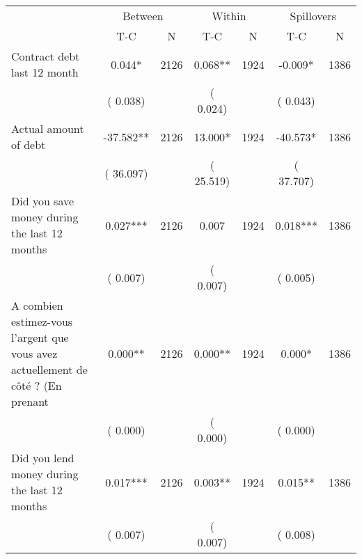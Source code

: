 
\begin{tabular}{l*{6}{c}}\hline&\multicolumn{2}{c}{Between}&\multicolumn{2}{c}{Within}&\multicolumn{2}{c}{Spillovers} \\ \cmidrule(r){2-3}\cmidrule(l){4-5}\cmidrule(l){6-7} & {T-C} & {N} & {T-C} & {N}  & {T-C}  & {N}  \\ \midrule
Contract debt last 12 month        &              0.044*      &       2126       &              0.068**      &       1924       &             -0.009*      &       1386       \\
                       &       (       0.038)            &                               &       (       0.024)            &                               &       (       0.043)            &                               \\
Actual amount of debt        &            -37.582**      &       2126       &             13.000*      &       1924       &            -40.573*      &       1386       \\
                       &       (      36.097)            &                               &       (      25.519)            &                               &       (      37.707)            &                               \\
Did you save money during the last 12 months        &              0.027***      &       2126       &              0.007      &       1924       &              0.018***      &       1386       \\
                       &       (       0.007)            &                               &       (       0.007)            &                               &       (       0.005)            &                               \\
A combien estimez-vous l'argent que vous avez actuellement de côté ? (En prenant        &              0.000**      &       2126       &              0.000**      &       1924       &              0.000*      &       1386       \\
                       &       (       0.000)            &                               &       (       0.000)            &                               &       (       0.000)            &                               \\
Did you lend money during the last 12 months        &              0.017***      &       2126       &              0.003**      &       1924       &              0.015**      &       1386       \\
                       &       (       0.007)            &                               &       (       0.007)            &                               &       (       0.008)            &                               \\
\hline \end{tabular}